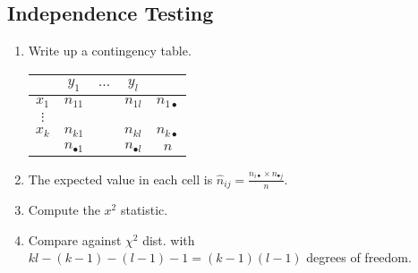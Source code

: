 \documentclass[twocolumn,english]{article}
\providecommand{\tabularnewline}{\\}
\providecommand{\tabularnewline}{\\}
\providecommand{\tabularnewline}{\\}
\begin{document}
\subsection{Independence Testing}
\begin{enumerate}
\item Write up a contingency table. 
\begin{table}[H]
\centering{}%
\begin{tabular}{c|ccc|c}
 & $y_{1}$  & $\dots$  & $y_{l}$  & \tabularnewline
\hline 
$x_{1}$  & $n_{11}$  &  & $n_{1l}$  & $n_{1\bullet}$\tabularnewline
$\vdots$  &  &  &  & \tabularnewline
$x_{k}$  & $n_{k1}$  &  & $n_{kl}$  & $n_{k\bullet}$\tabularnewline
\hline 
 & $n_{\bullet1}$  &  & $n_{\bullet l}$  & $n$\tabularnewline
\end{tabular}
\end{table}

\item The expected value in each cell is $\hat{n}_{ij}=\frac{n_{i\bullet}\times n_{\bullet j}}{n}$. 
\item Compute the $x^{2}$ statistic. 
\item Compare against $\chi^{2}$ dist. with $kl-\left(k-1\right)-\left(l-1\right)-1=\left(k-1\right)\left(l-1\right)$
degrees of freedom. \end{enumerate}
\end{document}
